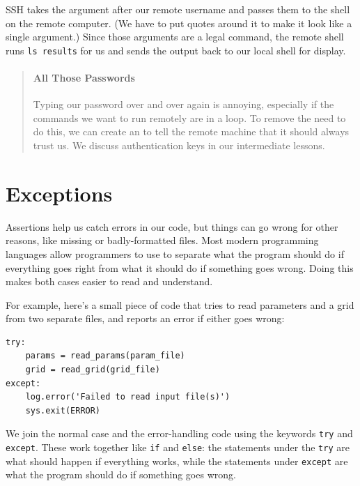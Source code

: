 \documentclass{book}
\begin{document}
SSH takes the argument after our remote username and passes them to the
shell on the remote computer. (We have to put quotes around it to make
it look like a single argument.) Since those arguments are a legal
command, the remote shell runs \texttt{ls results} for us and sends the
output back to our local shell for display.

\begin{quote}
\mbox{}\paragraph{All Those Passwords}

Typing our password over and over again is annoying, especially if the
commands we want to run remotely are in a loop. To remove the need to do
this, we can create an  to tell the remote machine that it should always trust us. We
discuss authentication keys in our intermediate lessons.
\end{quote}

\section{Exceptions}

Assertions help us catch errors in our code, but things can go wrong for
other reasons, like missing or badly-formatted files. Most modern
programming languages allow programmers to use
 to separate what the program should
do if everything goes right from what it should do if something goes
wrong. Doing this makes both cases easier to read and understand.

For example, here's a small piece of code that tries to read parameters
and a grid from two separate files, and reports an error if either goes
wrong:

\begin{verbatim}
try:
    params = read_params(param_file)
    grid = read_grid(grid_file)
except:
    log.error('Failed to read input file(s)')
    sys.exit(ERROR)
\end{verbatim}

We join the normal case and the error-handling code using the keywords
\texttt{try} and \texttt{except}. These work together like \texttt{if}
and \texttt{else}: the statements under the \texttt{try} are what should
happen if everything works, while the statements under \texttt{except}
are what the program should do if something goes wrong.
\end{document}
